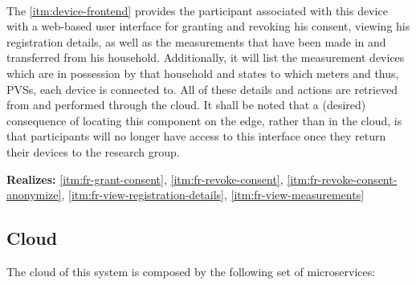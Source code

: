 \begin{description}[format={\storedescriptionlabel}]
  \item[Device Frontend\label{itm:device-frontend}]
  \hfill \\
  The \ref{itm:device-frontend} provides the participant associated with this device with a web-based user interface for granting and revoking his consent, viewing his registration details, as well as the measurements that have been made in and transferred from his household. Additionally, it will list the measurement devices which are in possession by that household and states to which meters and thus, \acsp{PVS}, each device is connected to. All of these details and actions are retrieved from and performed through the cloud. It shall be noted that a (desired) consequence of locating this component on the edge, rather than in the cloud, is that participants will no longer have access to this interface once they return their devices to the research group.

  \textbf{Realizes:} \ref{itm:fr-grant-consent}, \ref{itm:fr-revoke-consent}, \ref{itm:fr-revoke-consent-anonymize}, \ref{itm:fr-view-registration-details}, \ref{itm:fr-view-measurements}
\end{description}


\subsection{Cloud}
\label{sec:component-design-cloud}

The cloud of this system is composed by the following set of microservices:

